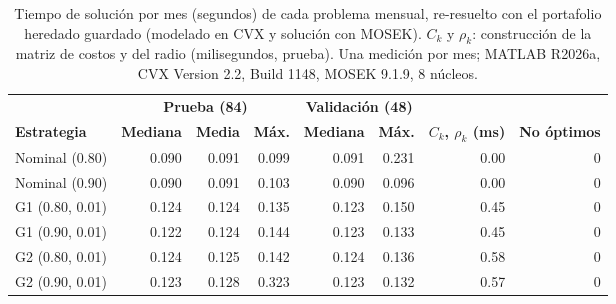 \begin{table}[h]
\centering
\footnotesize
\setlength{\tabcolsep}{4pt}
\caption{Tiempo de solución por mes (segundos) de cada problema mensual, re-resuelto con el portafolio heredado guardado (modelado en CVX y solución con MOSEK). $C_k$ y $\rho_k$: construcción de la matriz de costos y del radio (milisegundos, prueba). Una medición por mes; MATLAB R2026a, CVX Version 2.2, Build 1148, MOSEK 9.1.9, 8 núcleos.}\label{tab:tiempos}
\begin{tabular}{|l|r|r|r|r|r|r|r|}
\hline
 & \multicolumn{3}{c|}{\textbf{Prueba (84)}} & \multicolumn{2}{c|}{\textbf{Validación (48)}} & & \\ \cline{2-6}
\textbf{Estrategia} & \textbf{Mediana} & \textbf{Media} & \textbf{Máx.} & \textbf{Mediana} & \textbf{Máx.} & \textbf{$C_k$, $\rho_k$ (ms)} & \textbf{No óptimos} \\ \hline
Nominal (0.80) & 0.090 & 0.091 & 0.099 & 0.091 & 0.231 & 0.00 & 0 \\ \hline
Nominal (0.90) & 0.090 & 0.091 & 0.103 & 0.090 & 0.096 & 0.00 & 0 \\ \hline
G1 (0.80, 0.01) & 0.124 & 0.124 & 0.135 & 0.123 & 0.150 & 0.45 & 0 \\ \hline
G1 (0.90, 0.01) & 0.122 & 0.124 & 0.144 & 0.123 & 0.133 & 0.45 & 0 \\ \hline
G2 (0.80, 0.01) & 0.124 & 0.125 & 0.142 & 0.124 & 0.136 & 0.58 & 0 \\ \hline
G2 (0.90, 0.01) & 0.123 & 0.128 & 0.323 & 0.123 & 0.132 & 0.57 & 0 \\ \hline
\end{tabular}
\end{table}
